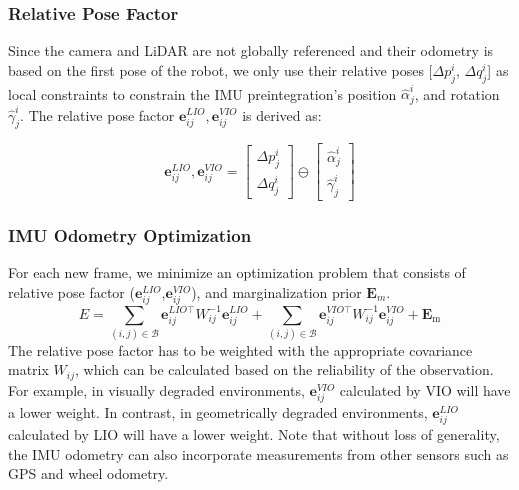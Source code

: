 \subsubsection{\textbf{Relative Pose Factor}}
Since the camera and LiDAR are not globally referenced and their odometry is based on the first pose of the robot, we only use their relative poses [$\Delta p_j^i$, $\Delta q_j^i$] as local constraints to constrain the IMU preintegration's position $\hat \alpha _j^i$, and rotation $\hat \gamma _j^i$. 
The relative pose factor $\mathbf{e}_{i j}^{LIO},\mathbf{e}_{i j}^{VIO}$ is derived as:

\begin{equation}
	\mathbf{e}_{i j}^{LIO},\mathbf{e}_{i j}^{VIO}=\left[ {\begin{array}{*{20}{c}}
{\Delta p_j^i}\\
{\Delta q_j^i}
\end{array}} \right] \ominus \left[ {\begin{array}{*{20}{c}}
{\hat \alpha _j^i}\\
{\hat \gamma _j^i}
\end{array}} \right]
\end{equation}

\subsubsection{\textbf{IMU Odometry Optimization}}
For each new frame, we minimize an optimization problem that consists of relative pose factor ($\mathbf{e}_{i j}^{LIO}$,$\mathbf{e}_{i j}^{VIO}$), and marginalization prior $\mathbf{E}_{m}$.
\begin{equation}
	E=\sum_{(i, j) \in \mathcal{B}} \mathbf{e}_{i j}^{LIO\top} {W}_{i j}^{-1} \mathbf{e}_{i j}^{LIO}+
	\sum_{(i, j) \in \mathcal{B}} \mathbf{e}_{i j}^{VIO\top}{W}_{i j}^{-1} \mathbf{e}_{i j}^{VIO}+\mathbf{E}_{\mathrm{m}}
\end{equation}
The relative pose factor has to be weighted with the appropriate covariance matrix ${W}_{ij}$, which can be calculated based on the reliability of the observation. For example, in visually degraded environments, $\mathbf{e}_{ij}^{VIO}$ calculated by VIO will have a lower weight. In contrast, in geometrically degraded environments, $\mathbf{e}_{ij}^{LIO}$ calculated by LIO will have a lower weight. Note that without loss of generality, the IMU odometry can also incorporate measurements from other sensors such as GPS and wheel odometry. 



